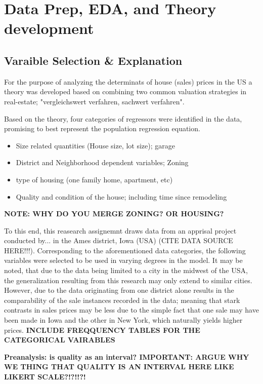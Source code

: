 \documentclass{article}
\begin{document}
\section{Data Prep, EDA, and Theory development}
\subsection{Varaible Selection \& Explanation}
\indent For the purpose of analyzing the determinats of house (sales) prices in the US a theory was developed based on combining two common valuation strategies in real-estate; "vergleichswert verfahren, sachwert verfahren".

\indent Based on the theory, four categories of regressors were identified in the data, promising to best represent the population regression equation. 
\begin{itemize}
  \item Size related quantities (House size, lot size); garage
  \item District and Neighborhood dependent variables; Zoning
  \item type of housing (one family home, apartment, etc)
  \item Quality and condition of the house; including time since remodeling
\end{itemize}

\textbf{NOTE: WHY DO YOU MERGE ZONING? OR HOUSING?}

To this end, this reasearch assignemnt draws data from an apprisal project conducted by... in the Ames district, Iowa (USA) (CITE DATA SOURCE HERE!!!). Corresponding to the aforementioned data categories, the following variables were selected to be used in varying degrees in the model. It may be noted, that due to the data being limited to a city in the midwest of the USA, the generalization resulting from this research may only extend to similar cities. However, due to the data originating from one district alone results in the comparability of the sale instances recorded in the data; meaning that stark contrasts in sales prices may be less due to the simple fact that one sale may have been made in Iowa and the other in New York, which naturally yields higher prices.
\textbf{INCLUDE FREQQUENCY TABLES FOR THE CATEGORICAL VAIRABLES}

\textbf{Preanalysis: is quality as an interval? IMPORTANT: ARGUE WHY WE THING THAT QUALITY IS AN INTERVAL HERE LIKE LIKERT SCALE?!?!!?!}
\end{document}
